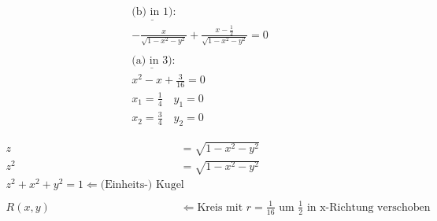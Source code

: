 
\begin{align*}
    \underline{\text{(b) in } 1)}: \\
    - \frac{x}{\sqrt{1 - x^2 - y^2}} + \frac{x - \frac{1}{2}}{\sqrt{1 - x^2 - y^2}} = 0 \\ %
    \\
    \underline{\text{(a) in } 3)}: \\
    x^2 - x + \frac{3}{16} = 0 \\
    x_1 = \frac{1}{4} \quad y_1 = 0 \\
    x_2 = \frac{3}{4} \quad y_2 = 0
\end{align*}

\begin{align*}
    z &= \sqrt{1 - x^2 - y^2} \\
    z^2 &= \sqrt{1 - x^2 - y^2} \\
    z^2 + x^2 + y^2 = 1 \Leftarrow \text{(Einheits-) Kugel} \\
    \\
    R(x,y) &\Leftarrow \text{Kreis mit } r = \frac{1}{16} \text{ um } \frac{1}{2} \text{ in x-Richtung verschoben} 
\end{align*}

